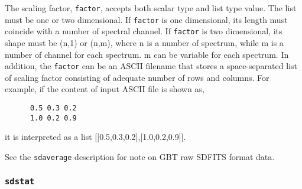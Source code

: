     The scaling factor, {\tt factor}, accepts both scalar type and list type
    value. The list must be one or two dimensional. If {\tt factor} is one
    dimensional, its length must coincide with a number of spectral
    channel. If {\tt factor} is two dimensional, its shape must be (n,1) or
    (n,m), where n is a number of spectrum, while m is a number of channel
    for each spectrum. m can be variable for each spectrum. In addition,
    the {\tt factor} can be an ASCII filename that stores a space-separated list
    of scaling factor consisting of adequate number of rows and columns.
    For example, if the content of input ASCII file is shown as,

    \begin{verbatim}
      0.5 0.3 0.2
      1.0 0.2 0.9
    \end{verbatim}

    it is interpreted as a list [[0.5,0.3,0.2],[1.0,0.2,0.9]].

    See the {\tt sdaverage} description for note on GBT raw SDFITS format data.

\subsubsection{{\tt sdstat}}
\label{section:sd.sdtasks.tasks.sdstat}

